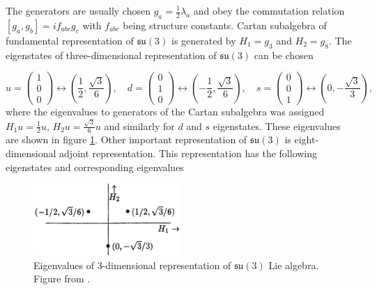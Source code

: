 \documentclass[a4paper,11pt]{report}
\begin{document}
The generators are usually chosen $g_a = \frac{1}{2} \lambda_a$ and obey the
commutation relation $[g_a,g_b]=if_{abc}g_c$ with $f_{abc}$ being structure
constants. Cartan subalgebra of fundamental representation of $\mathfrak{su}(3)$
is generated by $H_1=g_3$ and $H_2=g_8$. The eigenstates of three-dimensional
representation of $\mathfrak{su}(3)$ can be chosen 

\begin{equation}
  u = \begin{pmatrix} 1 \\ 0 \\ 0 \end{pmatrix} \leftrightarrow \left(
    \frac{1}{2}, \frac{\sqrt{3}}{6} \right), \quad
  d = \begin{pmatrix} 0 \\ 1 \\ 0 \end{pmatrix} \leftrightarrow \left(
    - \frac{1}{2}, \frac{\sqrt{3}}{6} \right), \quad
  s = \begin{pmatrix} 0 \\ 0 \\ 1 \end{pmatrix} \leftrightarrow \left(
    0, - \frac{\sqrt{3}}{3} \right), \quad
  \label{eq:RepresentLie3}
\end{equation}
where the eigenvalues to generators of the Cartan subalgebra was assigned $H_1 u
= \frac{1}{2} u$, $H_2 u = \frac{\sqrt{3}}{6} u$ and similarly for $d$ and $s$
eigenstates. These eigenvalues are shown in figure \ref{fig:QuarkTriplet}. Other
important representation of $\mathfrak{su}(3)$ is eight-dimensional adjoint
representation. This representation has the following eigenstates and
corresponding eigenvalues

\begin{figure}[t]
  \centering
  \includegraphics[width=0.5\textwidth]{Chapter1/Quark-triplet.png} 
  \caption{Eigenvalues of 3-dimensional representation of $\mathfrak{su}(3)$ Lie algebra. Figure
    from \cite{LieAlgebrasForParticlePhysicists}.}
  \label{fig:QuarkTriplet}
\end{figure}
\end{document}
